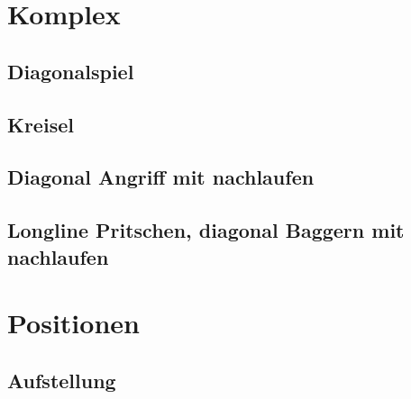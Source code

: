 \documentclass[]{book}
\begin{document}
\chapter{Komplex}\label{komplex}

\section{Diagonalspiel}\label{diagonalspiel}

\section{Kreisel}\label{kreisel}

\section{Diagonal Angriff mit
nachlaufen}\label{diagonal-angriff-mit-nachlaufen}

\section{Longline Pritschen, diagonal Baggern mit
nachlaufen}\label{longline-pritschen-diagonal-baggern-mit-nachlaufen}

\chapter{Positionen}\label{positionen}

\section{Aufstellung}\label{aufstellung}


\end{document}
